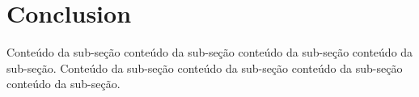 \documentclass[12pt]{article}
\begin{document}
	\section{Conclusion}
		
	Conteúdo da sub-seção conteúdo da sub-seção conteúdo da sub-seção conteúdo da sub-seção.
	\noindent Conteúdo da sub-seção conteúdo da sub-seção conteúdo da sub-seção conteúdo da sub-seção.
    
     
	
	
	
	
	
	
	
	
	
	
	
	
	
	\nocite{2}
	\nocite{3}
	\nocite{4}
	\nocite{5}
	
	\newpage
	
	
	
\end{document}
